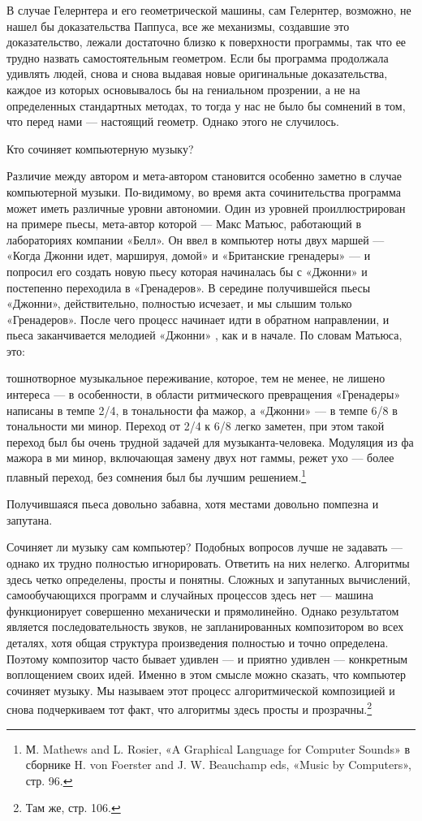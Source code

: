 В случае Гелернтера и его геометрической машины, сам Гелернтер, возможно, не нашел бы доказательства Паппуса, все же механизмы, создавшие это доказательство, лежали достаточно близко к поверхности программы, так что ее трудно назвать самостоятельным геометром. Если бы программа продолжала удивлять людей, снова и снова выдавая новые оригинальные доказательства, каждое из которых основывалось бы на гениальном прозрении, а не на определенных стандартных методах, то тогда у нас не было бы сомнений в том, что перед нами --- настоящий геометр. Однако этого не случилось.

Кто сочиняет компьютерную музыку?

Различие между автором и мета-автором становится особенно заметно в случае компьютерной музыки. По-видимому, во время акта сочинительства программа может иметь различные уровни автономии. Один из уровней проиллюстрирован на примере пьесы, мета-автор которой --- Макс Матьюс, работающий в лабораториях компании «Белл». Он ввел в компьютер ноты двух маршей --- «Когда Джонни идет, маршируя, домой» и «Британские гренадеры» --- и попросил его создать новую пьесу которая начиналась бы с «Джонни» и постепенно переходила в «Гренадеров». В середине получившейся пьесы «Джонни», действительно, полностью исчезает, и мы слышим только «Гренадеров». После чего процесс начинает идти в обратном направлении, и пьеса заканчивается мелодией «Джонни» , как и в начале. По словам Матьюса, это:

тошнотворное музыкальное переживание, которое, тем не менее, не лишено интереса --- в особенности, в области ритмического превращения «Гренадеры» написаны в темпе 2/4, в тональности фа мажор, а «Джонни» --- в темпе 6/8 в тональности ми минор. Переход от 2/4 к 6/8 легко заметен, при этом такой переход был бы очень трудной задачей для музыканта-человека. Модуляция из фа мажора в ми минор, включающая замену двух нот гаммы, режет ухо --- более плавный переход, без сомнения был бы лучшим решением.\footnote{М. Mathews and L. Rosier, «A Graphical Language for Computer Sounds» в сборнике H. von Foerster and J. W. Beauchamp eds, «Music by Computers», стр. 96.}

Получившаяся пьеса довольно забавна, хотя местами довольно помпезна и запутана.

Сочиняет ли музыку сам компьютер? Подобных вопросов лучше не задавать --- однако их трудно полностью игнорировать. Ответить на них нелегко. Алгоритмы здесь четко определены, просты и понятны. Сложных и запутанных вычислений, самообучающихся программ и случайных процессов здесь нет --- машина функционирует совершенно механически и прямолинейно. Однако результатом является последовательность звуков, не запланированных композитором во всех деталях, хотя общая структура произведения полностью и точно определена. Поэтому композитор часто бывает удивлен --- и приятно удивлен --- конкретным воплощением своих идей. Именно в этом смысле можно сказать, что компьютер сочиняет музыку. Мы называем этот процесс алгоритмической композицией и снова подчеркиваем тот факт, что алгоритмы здесь просты и прозрачны.\footnote{Там же, стр. 106.}

